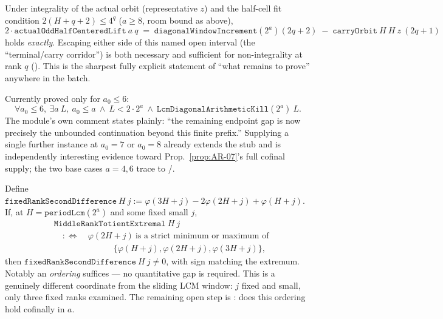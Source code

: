 \begin{prop}\label{prop:TE-06}
Under integrality of the actual orbit (representative $z$) and the half-cell fit condition
$2(H+q+2)\le 4^q$ ($a\ge 8$, room bound as above),
\[
2\cdot \mathtt{actualOddHalfCenteredLift}\ a\ q \;=\; \mathtt{diagonalWindowIncrement}(2^a)(2q+2) \;-\; \mathtt{carryOrbit}\ H\ H\ z\ (2q+1)
\]
holds \emph{exactly}. Escaping either side of this named open interval (the ``terminal/carry
corridor'') is both necessary and sufficient for non-integrality at rank $q$
(). This is
the sharpest fully explicit statement of ``what remains to prove'' anywhere in the batch.
\ \ \\
\end{prop}

\begin{prop}[Extend the short-kill stub past $a_0=6$]\label{prop:SK-02}
Currently proved only for $a_0\le 6$:
\[
\forall a_0\le 6,\ \exists a\ L,\ a_0\le a\ \wedge\ L<2\cdot2^a\ \wedge\ \mathtt{LcmDiagonalArithmeticKill}(2^a)\ L.
\]
The module's own comment states plainly: ``the remaining endpoint gap is now precisely the
unbounded continuation beyond this finite prefix.'' Supplying a single further instance at
$a_0=7$ or $a_0=8$ already extends the stub and is independently interesting evidence toward
Prop.~\ref{prop:AR-07}'s full cofinal supply; the two base cases $a=4,6$ trace to
/.
\ \ \\
\end{prop}

\begin{prop}\label{prop:FR-01}
Define $\mathtt{fixedRankSecondDifference}\ H\ j := \varphi(3H+j)-2\varphi(2H+j)+\varphi(H+j)$.
If, at $H=\mathtt{periodLcm}(2^a)$ and some fixed small $j$,
\[
\begin{aligned}
&\mathtt{MiddleRankTotientExtremal}\ H\ j \\[2pt]
&\quad:\iff\quad \varphi(2H+j)\ \text{is a strict minimum or maximum of} \\
&\hspace{7em}\{\varphi(H+j),\varphi(2H+j),\varphi(3H+j)\},
\end{aligned}
\]
then $\mathtt{fixedRankSecondDifference}\ H\ j\ne 0$, with sign matching the extremum. Notably
an \emph{ordering} suffices — no quantitative gap is required. This is a genuinely different
coordinate from the sliding LCM window: $j$ fixed and small, only three fixed ranks examined.
The remaining open step is : does this ordering hold
cofinally in $a$.
\ \ \\
\end{prop}

